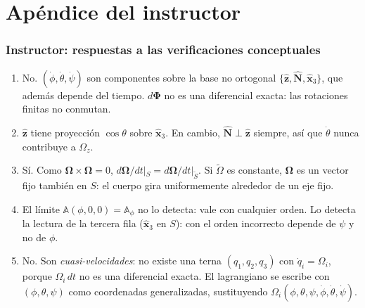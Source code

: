 \documentclass[spanish]{beamer}
\newif\ifinstructor
\newcommand{\uv}[1]{\hat{\mathbf{#1}}}          %
\newcommand{\bOmega}{\bm{\Omega}}               %
\newcommand{\dPhi}{d\bm{\Phi}}                  %
\newcommand{\Rot}{\mathbb{A}}                   %
\newcommand{\Slab}{S}                           %
\newcommand{\Scue}{\tilde{S}}                   %
\newcommand{\colCue}[1]{\tilde{\mathsf{#1}}}    %
\begin{document}
\ifinstructor
\appendix
\section*{Apéndice del instructor}

\begin{frame}
  \frametitle{Instructor: respuestas a las verificaciones conceptuales}
  \footnotesize
  \begin{enumerate}
    \item No. $(\dot\phi,\dot\theta,\dot\psi)$ son componentes sobre la base no ortogonal
          $\{\uv{z},\uv{N},\uv{x}_3\}$, que además depende del tiempo. $\dPhi$ no es una
          diferencial exacta: las rotaciones finitas no conmutan.
    \item $\uv{z}$ tiene proyección $\cos\theta$ sobre $\uv{x}_3$. En cambio,
          $\uv{N}\perp\uv{z}$ siempre, así que $\dot\theta$ nunca contribuye a $\Omega_z$.
    \item Sí. Como $\bOmega\times\bOmega=0$,
          $d\bOmega/dt|_{\Slab}=d\bOmega/dt|_{\Scue}$. Si $\colCue{\Omega}$ es constante,
          $\bOmega$ es un vector fijo también en $\Slab$: el cuerpo gira uniformemente
          alrededor de un eje fijo.
    \item El límite $\Rot(\phi,0,0)=\Rot_\phi$ no lo detecta: vale con cualquier orden.
          Lo detecta la lectura de la tercera fila ($\uv{x}_3$ en $\Slab$): con el orden
          incorrecto depende de $\psi$ y no de $\phi$.
    \item No. Son \emph{cuasi-velocidades}: no existe una terna $(q_1,q_2,q_3)$ con
          $\dot q_i=\Omega_i$, porque $\Omega_i\,dt$ no es una diferencial exacta. El
          lagrangiano se escribe con $(\phi,\theta,\psi)$ como coordenadas
          generalizadas, sustituyendo $\Omega_i(\phi,\theta,\psi,\dot\phi,\dot\theta,\dot\psi)$.
  \end{enumerate}
\end{frame}
\end{document}
